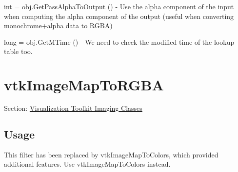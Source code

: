 \begin{DoxyItemize}
\item {\ttfamily int = obj.\-Get\-Pass\-Alpha\-To\-Output ()} -\/ Use the alpha component of the input when computing the alpha component of the output (useful when converting monochrome+alpha data to R\-G\-B\-A)  
\item {\ttfamily long = obj.\-Get\-M\-Time ()} -\/ We need to check the modified time of the lookup table too.  
\end{DoxyItemize}\hypertarget{vtkimaging_vtkimagemaptorgba}{}\section{vtk\-Image\-Map\-To\-R\-G\-B\-A}\label{vtkimaging_vtkimagemaptorgba}
Section\-: \hyperlink{sec_vtkimaging}{Visualization Toolkit Imaging Classes} \hypertarget{vtkwidgets_vtkxyplotwidget_Usage}{}\subsection{Usage}\label{vtkwidgets_vtkxyplotwidget_Usage}
This filter has been replaced by vtk\-Image\-Map\-To\-Colors, which provided additional features. Use vtk\-Image\-Map\-To\-Colors instead.

